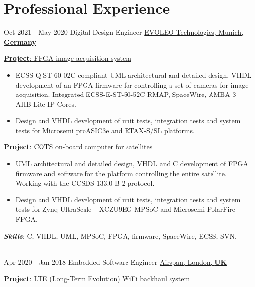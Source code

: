 \documentclass[letterpaper]{twentysecondcv} %
\begin{document}
\newpage
\makeextrainfo %

\section{Professional Experience}

\begin{twenty}
    \twentyitem
    {Oct 2021 -}
    {May 2020}
    {Digital Design Engineer}
    {\href{http://evoleotech.com/company/}{EVOLEO Technologies, Munich, \textbf{Germany}}}
    {}
    {
        \vspace{2 mm}
        \underline{\textbf{Project}: FPGA image acquisition system}

        \vspace{2 mm}
        \begin{itemize}
            \item ECSS-Q-ST-60-02C compliant UML architectural and detailed design, VHDL development of an FPGA firmware for controlling a set of cameras for image acquisition. Integrated ECSS-E-ST-50-52C RMAP, SpaceWire, AMBA 3 AHB-Lite IP Cores.
            \item Design and VHDL development of unit tests, integration tests and system tests for Microsemi proASIC3e and RTAX-S/SL platforms.
        \end{itemize}

        \vspace{2 mm}
        \underline{\textbf{Project}: COTS on-board computer for satellites}

        \vspace{2 mm}
        \begin{itemize}
            \item UML architectural and detailed design, VHDL and C development of FPGA firmware and software for the platform controlling the entire satellite. Working with the CCSDS 133.0-B-2 protocol.
            \item Design and VHDL development of unit tests, integration tests and system tests for Zynq UltraScale+ XCZU9EG MPSoC and Microsemi PolarFire FPGA.
        \end{itemize}

        \vspace{2 mm}
        \textbf{\textit{Skills}}: C, VHDL, UML, MPSoC, FPGA, firmware, SpaceWire, ECSS, SVN.
    }\\
    \twentyitem
    	{Apr 2020 -}
		{Jan 2018}
        {Embedded Software Engineer}
        {\href{https://www.airspan.com/}{Airspan, London, \textbf{UK}}}
        {}
        {
            \vspace{2 mm}
            \underline{\textbf{Project}: LTE (Long-Term Evolution) WiFi backhaul system}

}
\end{twenty}
\end{document}
